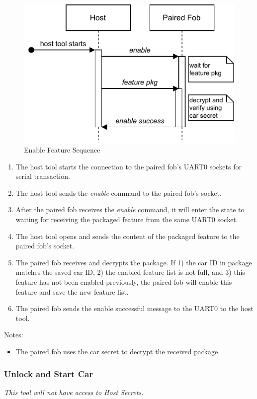 \documentclass[11pt,oneside,onecolumn,letterpaper]{article}
\begin{document}
\begin{figure}[!htbp]
	\begin{centering}
		\includegraphics[width = .5\textwidth]{pic/enable.pdf}
		\caption{Enable Feature Sequence}
		\label{fig:enable}
	\end{centering}
\end{figure}

\begin{enumerate}
	\item The host tool starts the connection to the paired fob's UART0 sockets for serial transaction.
	\item The host tool sends the \textit{enable} command to the paired fob's socket.
	\item After the paired fob receives the \textit{enable} command, it will enter the state to waiting for receiving the packaged feature from the same UART0 socket.
	\item The host tool opens and sends the content of the packaged feature to the paired fob's socket.
	\item The paired fob receives and decrypts the package. If 1) the car ID in package matches the saved car ID, 2) the enabled feature list is not full, and 3) this feature has not been  enabled previously, the paired fob will enable this feature and save the new feature list.
	\item The paired fob sends the enable successful message to the UART0 to the host tool.
\end{enumerate}

Notes:
\begin{itemize}
	\item The paired fob uses the car secret to decrypt the received package.
\end{itemize}

\subsubsection{Unlock and Start Car}

\textit{This tool will not have access to Host Secrets.}
\end{document}
